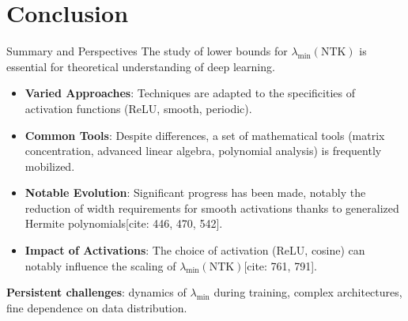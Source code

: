 \documentclass{beamer}
\theoremstyle{definition}
\theoremstyle{remark}
\newcommand{\lambdaMin}{\lambda_{\min}}
\begin{document}
\section{Conclusion}
\begin{frame}{Summary and Perspectives}
  \justify
  The study of lower bounds for $\lambdaMin(\text{NTK})$ is essential for theoretical understanding of deep learning.
  \begin{itemize}
    \item \textbf{Varied Approaches}: Techniques are adapted to the specificities of activation functions (ReLU, smooth, periodic).
    \item \textbf{Common Tools}: Despite differences, a set of mathematical tools (matrix concentration, advanced linear algebra, polynomial analysis) is frequently mobilized.
    \item \textbf{Notable Evolution}: Significant progress has been made, notably the reduction of width requirements for smooth activations thanks to generalized Hermite polynomials[cite: 446, 470, 542].
    \item \textbf{Impact of Activations}: The choice of activation (ReLU, cosine) can notably influence the scaling of $\lambdaMin(\text{NTK})$[cite: 761, 791].
  \end{itemize}
  \vspace{1em}
  \textbf{Persistent challenges}: dynamics of $\lambdaMin$ during training, complex architectures, fine dependence on data distribution.
\end{frame}

\end{document}
